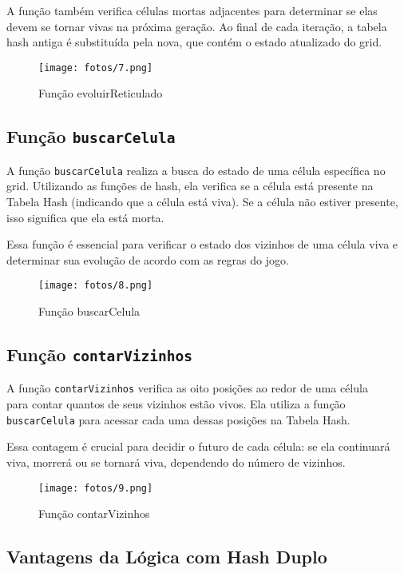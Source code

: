 \documentclass[a4paper,12pt]{article}
\begin{document}
A função também verifica células mortas adjacentes para determinar se elas devem se tornar vivas na próxima geração. Ao final de cada iteração, a tabela hash antiga é substituída pela nova, que contém o estado atualizado do grid.

\begin{figure}[H]
    \centering
    \texttt{[image: fotos/7.png]}
    \caption{Função evoluirReticulado}
\end{figure}

\subsection{Função \texttt{buscarCelula}}

A função \texttt{buscarCelula} realiza a busca do estado de uma célula específica no grid. Utilizando as funções de hash, ela verifica se a célula está presente na Tabela Hash (indicando que a célula está viva). Se a célula não estiver presente, isso significa que ela está morta.

Essa função é essencial para verificar o estado dos vizinhos de uma célula viva e determinar sua evolução de acordo com as regras do jogo.

\begin{figure}[H]
    \centering
    \texttt{[image: fotos/8.png]}
    \caption{Função buscarCelula}
\end{figure}

\subsection{Função \texttt{contarVizinhos}}

A função \texttt{contarVizinhos} verifica as oito posições ao redor de uma célula \\
para contar quantos de seus vizinhos estão vivos. Ela utiliza a função \\
\texttt{buscarCelula} para acessar cada uma dessas posições na Tabela Hash.

Essa contagem é crucial para decidir o futuro de cada célula: se ela continuará viva, morrerá ou se tornará viva, dependendo do número de vizinhos.

\begin{figure}[H]
    \centering
    \texttt{[image: fotos/9.png]}
    \caption{Função contarVizinhos}
\end{figure}

\subsection{Vantagens da Lógica com Hash Duplo}
\end{document}
